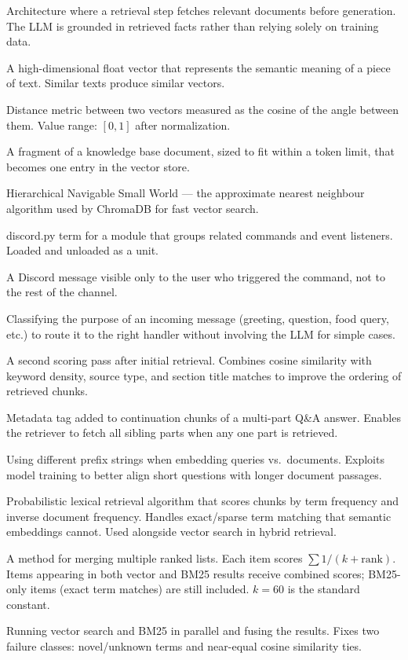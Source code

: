 \documentclass[12pt,letterpaper]{article}
\begin{document}
\begin{description}[leftmargin=3em, style=nextline]
  \item[RAG (Retrieval-Augmented Generation)] Architecture where a retrieval
    step fetches relevant documents before generation. The LLM is grounded in
    retrieved facts rather than relying solely on training data.
  \item[Embedding] A high-dimensional float vector that represents the semantic
    meaning of a piece of text. Similar texts produce similar vectors.
  \item[Cosine similarity] Distance metric between two vectors measured as the
    cosine of the angle between them. Value range: $[0, 1]$ after normalization.
  \item[Chunk] A fragment of a knowledge base document, sized to fit within a
    token limit, that becomes one entry in the vector store.
  \item[HNSW] Hierarchical Navigable Small World — the approximate nearest
    neighbour algorithm used by ChromaDB for fast vector search.
  \item[Cog] discord.py term for a module that groups related commands and
    event listeners. Loaded and unloaded as a unit.
  \item[Ephemeral message] A Discord message visible only to the user who
    triggered the command, not to the rest of the channel.
  \item[Intent detection] Classifying the purpose of an incoming message
    (greeting, question, food query, etc.) to route it to the right handler
    without involving the LLM for simple cases.
  \item[Reranking] A second scoring pass after initial retrieval. Combines
    cosine similarity with keyword density, source type, and section title
    matches to improve the ordering of retrieved chunks.
  \item[qa\_base\_id] Metadata tag added to continuation chunks of a multi-part
    Q\&A answer. Enables the retriever to fetch all sibling parts when any
    one part is retrieved.
  \item[Asymmetric retrieval] Using different prefix strings when embedding
    queries vs.\ documents. Exploits model training to better align short
    questions with longer document passages.
  \item[BM25 (Best Match 25)] Probabilistic lexical retrieval algorithm that
    scores chunks by term frequency and inverse document frequency. Handles
    exact/sparse term matching that semantic embeddings cannot. Used alongside
    vector search in hybrid retrieval.
  \item[Reciprocal Rank Fusion (RRF)] A method for merging multiple ranked
    lists. Each item scores $\sum 1/(k + \text{rank})$. Items appearing in
    both vector and BM25 results receive combined scores; BM25-only items
    (exact term matches) are still included. $k{=}60$ is the standard constant.
  \item[Hybrid retrieval] Running vector search and BM25 in parallel and
    fusing the results. Fixes two failure classes: novel/unknown terms and
    near-equal cosine similarity ties.
\end{description}
\end{document}
